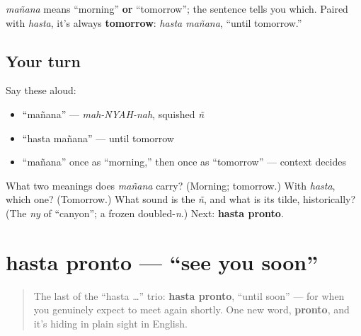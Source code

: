 \begin{grammarlens}[title={Grammar Lens: same word, two meanings — context decides}]
\emph{mañana} means \textquotedblleft{}morning\textquotedblright{} \textbf{or} \textquotedblleft{}tomorrow\textquotedblright{}; the sentence tells you which. Paired with \emph{hasta}, it's always \textbf{tomorrow}: \emph{hasta mañana}, \textquotedblleft{}until tomorrow.\textquotedblright{}
\end{grammarlens}

\subsection*{Your turn}
Say these aloud:

\begin{itemize}
\raggedright
  \item \textquotedblleft{}mañana\textquotedblright{} — \emph{mah-NYAH-nah}, squished \emph{ñ}
  \item \textquotedblleft{}hasta mañana\textquotedblright{} — until tomorrow
  \item “mañana” once as “morning,” then once as “tomorrow” — context decides
\end{itemize}

\begin{tcolorbox}[breakable,colback=teal!4,colframe=teal!35!black,title={Before you move on}]
What two meanings does \emph{mañana} carry? (Morning; tomorrow.) With \emph{hasta}, which one? (Tomorrow.) What sound is the \emph{ñ}, and what is its tilde, historically? (The \emph{ny} of \textquotedblleft{}canyon\textquotedblright{}; a frozen doubled-\emph{n}.) Next: \textbf{hasta pronto}.
\end{tcolorbox}
\section[hasta pronto]{hasta pronto — \textquotedblleft{}see you soon\textquotedblright{}}

\label{lesson:ES-C05-hasta-pronto}



\begin{quote}
The last of the \textquotedblleft{}hasta …\textquotedblright{} trio: \textbf{hasta pronto}, \textquotedblleft{}until soon\textquotedblright{} — for when you genuinely expect to meet again shortly. One new word, \textbf{pronto}, and it's hiding in plain sight in English.
\end{quote}

